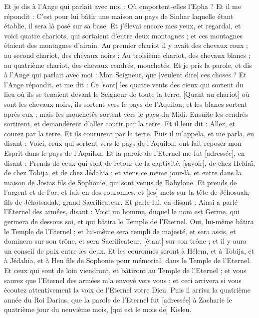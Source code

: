 \begin{multicols}{2}
Et je dis à l'Ange qui parlait avec moi : Où emportent-elles l'Epha ?
Et il me répondit : C'est pour lui bâtir une maison au pays de Sinhar laquelle étant établie, il sera là posé sur sa base.
\VerseOne{}Et j'élevai encore mes yeux, et regardai, et voici quatre chariots, qui sortaient d'entre deux montagnes ; et ces montagnes étaient des montagnes d'airain.
Au premier chariot il y avait des chevaux roux ; au second chariot, des chevaux noirs ;
Au troisième chariot, des chevaux blancs ; au quatrième chariot, des chevaux cendrés, mouchetés.
Et je pris la parole, et dis à l'Ange qui parlait avec moi : Mon Seigneur, que [veulent dire] ces choses ?
Et l'Ange répondit, et me dit : Ce [sont] les quatre vents des cieux qui sortent du lieu où ils se tenaient devant le Seigneur de toute la terre.
[Quant au chariot] où sont les chevaux noirs, ils sortent vers le pays de l'Aquilon, et les blancs sortent après eux ; mais les mouchetés sortent vers le pays du Midi.
Ensuite les cendrés sortirent, et demandèrent d'aller courir par la terre. Et il leur dit : Allez, et courez par la terre. Et ils coururent par la terre.
Puis il m'appela, et me parla, en disant : Voici, ceux qui sortent vers le pays de l'Aquilon, ont fait reposer mon Esprit dans le pays de l'Aquilon.
Et la parole de l'Eternel me fut [adressée], en disant :
Prends de ceux qui sont de retour de la captivité, [savoir], de chez Heldaï, de chez Tobija, et de chez Jédahïa ; et viens ce même jour-là, et entre dans la maison de Josias fils de Sophonie, qui sont venus de Babylone.
Et prends de l'argent et de l'or, et fais-en des couronnes, et [les] mets sur la tête de Jéhosuah, fils de Jéhotsadak, grand Sacrificateur.
Et parle-lui, en disant : Ainsi a parlé l'Eternel des armées, disant : Voici un homme, duquel le nom est Germe, qui germera de dessous soi, et qui bâtira le Temple de l'Eternel.
Oui, lui-même bâtira le Temple de l'Eternel ; et lui-même sera rempli de majesté, et sera assis, et dominera sur son trône, et sera Sacrificateur, [étant] sur son trône ; et il y aura un conseil de paix entre les deux.
Et les couronnes seront à Hélem, et à Tobija, et à Jédahïa, et à Hen fils de Sophonie pour mémorial, dans le Temple de l'Eternel.
Et ceux qui sont de loin viendront, et bâtiront au Temple de l'Eternel ; et vous saurez que l'Eternel des armées m'a envoyé vers vous ; et ceci arrivera si vous écoutez attentivement la voix de l'Eternel votre Dieu.
\VerseOne{}Puis il arriva la quatrième année du Roi Darius, que la parole de l'Eternel fut [adressée] à Zacharie le quatrième jour du neuvième mois, [qui est le mois de] Kisleu.

\end{multicols}
